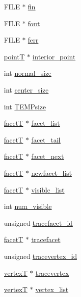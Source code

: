 \begin{DoxyCompactItemize}
F\+I\+L\+E $\ast$ \hyperlink{structqhT_a565be7be614732094ca6a196b2562085}{fin}
\item 
F\+I\+L\+E $\ast$ \hyperlink{structqhT_aa6bd299eb137e38308bb8560c1c482ce}{fout}
\item 
F\+I\+L\+E $\ast$ \hyperlink{structqhT_a1f5089c42cc1192b36b66f1a627d3c06}{ferr}
\item 
\hyperlink{libqhull_8h_a255fb21ed55a989ae9e4913f15015a97}{point\+T} $\ast$ \hyperlink{structqhT_af10f3705fd4a00400c276d2c674e4fae}{interior\+\_\+point}
\item 
int \hyperlink{structqhT_a8f9b99d196461a45a6f09c109555b417}{normal\+\_\+size}
\item 
int \hyperlink{structqhT_a9b9d2edb9fa627bc9390bad0c981349c}{center\+\_\+size}
\item 
int \hyperlink{structqhT_a11b0e297e26eb96dc4fbf5ef8b66cc48}{T\+E\+M\+Psize}
\item 
\hyperlink{structfacetT}{facet\+T} $\ast$ \hyperlink{structqhT_ac68d70c38b3922711fa29652b421f8db}{facet\+\_\+list}
\item 
\hyperlink{structfacetT}{facet\+T} $\ast$ \hyperlink{structqhT_a930a486a155a725bff4ef60199e259c4}{facet\+\_\+tail}
\item 
\hyperlink{structfacetT}{facet\+T} $\ast$ \hyperlink{structqhT_a220513267a8bdd745f78005dced69134}{facet\+\_\+next}
\item 
\hyperlink{structfacetT}{facet\+T} $\ast$ \hyperlink{structqhT_a758ccb570b4e0b2cd712952ff2e8eb22}{newfacet\+\_\+list}
\item 
\hyperlink{structfacetT}{facet\+T} $\ast$ \hyperlink{structqhT_a9d25c14e81755ec0893e33794845f9df}{visible\+\_\+list}
\item 
int \hyperlink{structqhT_a13329ea18b11bb4bcea3e182bdd49aaf}{num\+\_\+visible}
\item 
unsigned \hyperlink{structqhT_afed80216a389acc38b4fc74ee08bfcbf}{tracefacet\+\_\+id}
\item 
\hyperlink{structfacetT}{facet\+T} $\ast$ \hyperlink{structqhT_a4c1f0939ab45cd476fba6ec4f6cdbf1a}{tracefacet}
\item 
unsigned \hyperlink{structqhT_aee46c13d048cf89ad320b1eae41668e8}{tracevertex\+\_\+id}
\item 
\hyperlink{structvertexT}{vertex\+T} $\ast$ \hyperlink{structqhT_a5a77002d046c93b67607a56bfc68be73}{tracevertex}
\item 
\hyperlink{structvertexT}{vertex\+T} $\ast$ \hyperlink{structqhT_ac000ef95867eec33a0f9564435578d1a}{vertex\+\_\+list}
\item 

\end{DoxyCompactItemize}
